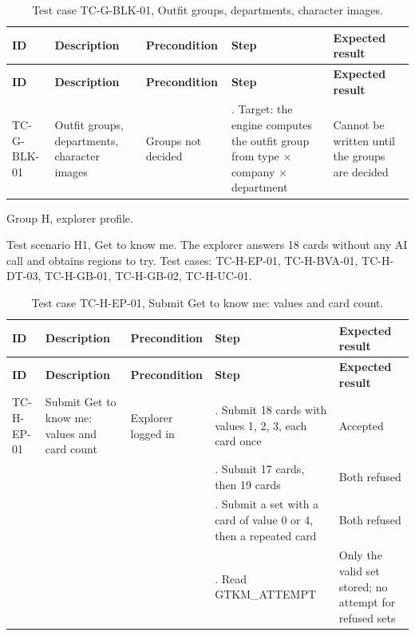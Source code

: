 {\small
\begin{longtable}{|>{\raggedright\arraybackslash}p{}|>{\raggedright\arraybackslash}p{}|>{\raggedright\arraybackslash}p{}|>{\raggedright\arraybackslash}p{}|>{\raggedright\arraybackslash}p{}|}
\caption{Test case TC-G-BLK-01, Outfit groups, departments, character images.} \\
\hline
\textbf{ID} & \textbf{Description} & \textbf{Precondition} & \textbf{Step} & \textbf{Expected result} \\ \hline
\endfirsthead
\hline
\textbf{ID} & \textbf{Description} & \textbf{Precondition} & \textbf{Step} & \textbf{Expected result} \\ \hline
\endhead
TC-G-BLK-01 & Outfit groups, departments, character images & Groups not decided & 1. Target: the engine computes the outfit group from type × company × department & Cannot be written until the groups are decided \\ \hline
\end{longtable}
}

Group H, explorer profile.

Test scenario H1, Get to know me. The explorer answers 18 cards without any AI call and obtains regions to try. Test cases: TC-H-EP-01, TC-H-BVA-01, TC-H-DT-03, TC-H-GB-01, TC-H-GB-02, TC-H-UC-01.

{\small
\begin{longtable}{|>{\raggedright\arraybackslash}p{}|>{\raggedright\arraybackslash}p{}|>{\raggedright\arraybackslash}p{}|>{\raggedright\arraybackslash}p{}|>{\raggedright\arraybackslash}p{}|}
\caption{Test case TC-H-EP-01, Submit Get to know me: values and card count.} \\
\hline
\textbf{ID} & \textbf{Description} & \textbf{Precondition} & \textbf{Step} & \textbf{Expected result} \\ \hline
\endfirsthead
\hline
\textbf{ID} & \textbf{Description} & \textbf{Precondition} & \textbf{Step} & \textbf{Expected result} \\ \hline
\endhead
TC-H-EP-01 & Submit Get to know me: values and card count & Explorer logged in & 1. Submit 18 cards with values 1, 2, 3, each card once & Accepted \\ \hline
 &  &  & 2. Submit 17 cards, then 19 cards & Both refused \\ \hline
 &  &  & 3. Submit a set with a card of value 0 or 4, then a repeated card & Both refused \\ \hline
 &  &  & 4. Read GTKM\_ATTEMPT & Only the valid set stored; no attempt for refused sets \\ \hline
\end{longtable}
}

